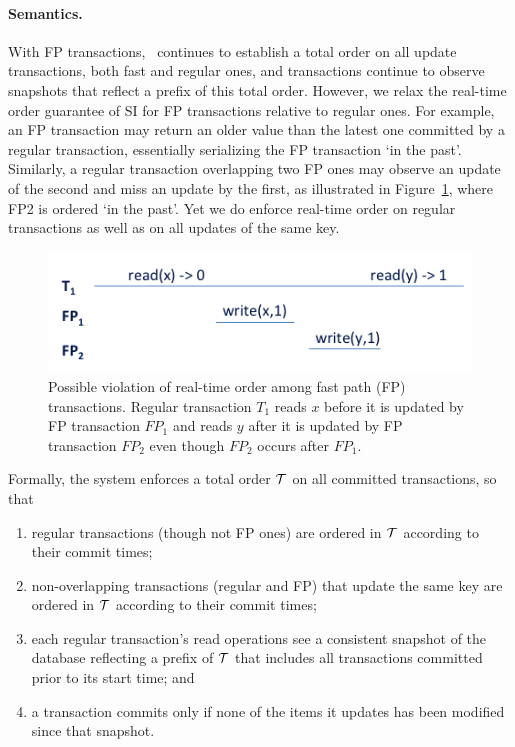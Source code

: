 \paragraph{Semantics.}

With FP transactions, 
\sys\ continues to establish a total order on all update transactions, both fast and regular ones, 
and transactions continue to observe snapshots that reflect a prefix of this total order.
However, we relax the real-time order guarantee of SI for FP transactions relative to regular ones. 
For example, an FP transaction may return 
an older value than the latest one committed by a regular transaction, essentially serializing the FP transaction `in the past'. 
Similarly, a regular transaction overlapping
two FP ones may observe an update of the second and miss an update by the first,  as illustrated in Figure~\ref{fig:ltx-rt},
where FP2 is ordered `in the past'.
Yet we do enforce real-time order on regular transactions as well as on all updates of the same key.

\begin{figure}[ht]
\includegraphics[width=\columnwidth]{figs/FP-semantics}
\caption{Possible violation of real-time order among fast path (FP) transactions. Regular transaction $T_1$
reads $x$ before it is updated by FP transaction $FP_1$ and reads $y$ after it is updated by FP transaction $FP_2$ even 
though $FP_2$ occurs after $FP_1$. 
}
\label{fig:ltx-rt}
\end{figure}

Formally, the system enforces a total order ${\cal T}$ on all committed transactions, so that
\begin{enumerate}
    \setlength{\itemsep}{0pt}
    \setlength{\parskip}{0pt}
    \setlength{\parsep}{2pt}  
\item
regular transactions (though not FP ones) are ordered in ${\cal T}$  according to their commit times;
\item
non-overlapping transactions (regular and FP) that update the same key are ordered in ${\cal T}$  according to their commit times;
\item
each regular transaction's read operations see a consistent snapshot of the database reflecting 
a prefix of  ${\cal T}$ that includes  all transactions committed prior to
its start time; and 
\item
 a transaction commits only if none of the items it updates has been modified since that snapshot.
 \end{enumerate}

